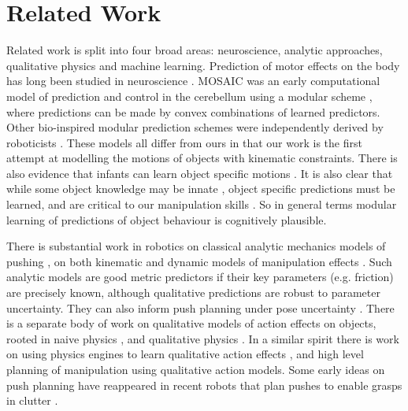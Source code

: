 \section{Related Work}\label{sec:Background}

Related work is split into four broad areas: neuroscience, analytic approaches, qualitative physics and machine learning. Prediction of motor effects on the body has long been studied in neuroscience \citep{Miall1996,flanagan03}.  MOSAIC was an early computational model of prediction and control in the cerebellum using a modular scheme \citep{Haruno_MOSAIC_2008}, where predictions can be made by convex combinations of learned predictors. Other bio-inspired modular prediction schemes were independently derived by roboticists \citep{demiris2006hierarchical}. These models all differ from ours in that our work is the first attempt at modelling the motions of objects with kinematic constraints. There is also evidence that infants can learn object specific motions \citep{Bahrick1995}. It is also clear that while some object knowledge may be innate \citep{spelke1994early}, object specific predictions must be learned, and are critical to our manipulation skills \citep{flanagan06}. So in general terms modular learning of predictions of object behaviour is cognitively plausible.

There is substantial work in robotics on classical analytic mechanics models of pushing \citep{mason_manipulator_1982,lynch_mechanics_1992,peshkin_motion_1988,cappelleri_designing_2006}, on both kinematic and dynamic models of manipulation effects \citep{mason_mechanics_2001}. Such analytic models are good metric predictors if their key parameters (e.g. friction) are precisely known, although qualitative predictions are robust to parameter uncertainty. They can also inform push planning under pose uncertainty \citep{brost1985planning}. There is a separate body of work on qualitative models of action effects on objects, rooted in naive physics \citep{hayes1995second}, and qualitative physics \citep{kuipers1986qualitative}. In a similar spirit there is work on using physics engines to learn qualitative action effects \citep{Mugan-tamd-12}, and high level planning of manipulation \citep{stillman08ijrr,roy2004mental} using qualitative action models. Some early ideas on push planning have reappeared in recent robots that plan pushes to enable grasps in clutter \citep{Dogar_2010}.

